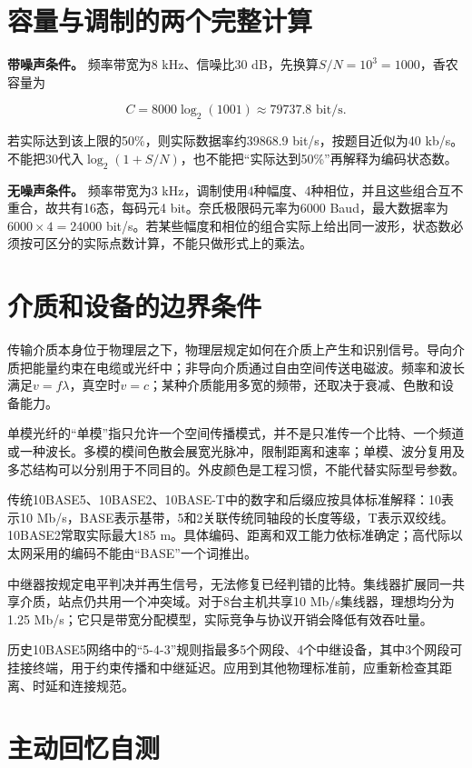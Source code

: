 \section{容量与调制的两个完整计算}\label{CN02-course-capacity}

\textbf{带噪声条件。} 频率带宽为8 kHz、信噪比30 dB，先换算\(S/N=10^3=1000\)，香农容量为

\[C=8000\log_2(1001)\approx79737.8\text{ bit/s}.\]

若实际达到该上限的50\%，则实际数据率约39868.9 bit/s，按题目近似为40 kb/s。不能把30代入\(\log_2(1+S/N)\)，也不能把``实际达到50\%''再解释为编码状态数。

\textbf{无噪声条件。} 频率带宽为3 kHz，调制使用4种幅度、4种相位，并且这些组合互不重合，故共有16态，每码元4 bit。奈氏极限码元率为6000 Baud，最大数据率为\(6000\times4=24000\) bit/s。若某些幅度和相位的组合实际上给出同一波形，状态数必须按可区分的实际点数计算，不能只做形式上的乘法。

\section{介质和设备的边界条件}\label{CN02-course-media}

传输介质本身位于物理层之下，物理层规定如何在介质上产生和识别信号。导向介质把能量约束在电缆或光纤中；非导向介质通过自由空间传送电磁波。频率和波长满足\(v=f\lambda\)，真空时\(v=c\)；某种介质能用多宽的频带，还取决于衰减、色散和设备能力。

单模光纤的``单模''指只允许一个空间传播模式，并不是只准传一个比特、一个频道或一种波长。多模的模间色散会展宽光脉冲，限制距离和速率；单模、波分复用及多芯结构可以分别用于不同目的。外皮颜色是工程习惯，不能代替实际型号参数。

传统10BASE5、10BASE2、10BASE-T中的数字和后缀应按具体标准解释：10表示10 Mb/s，BASE表示基带，5和2关联传统同轴段的长度等级，T表示双绞线。10BASE2常取实际最大185 m。具体编码、距离和双工能力依标准确定；高代际以太网采用的编码不能由``BASE''一个词推出。

中继器按规定电平判决并再生信号，无法修复已经判错的比特。集线器扩展同一共享介质，站点仍共用一个冲突域。对于8台主机共享10 Mb/s集线器，理想均分为1.25 Mb/s；它只是带宽分配模型，实际竞争与协议开销会降低有效吞吐量。

历史10BASE5网络中的``5-4-3''规则指最多5个网段、4个中继设备，其中3个网段可挂接终端，用于约束传播和中继延迟。应用到其他物理标准前，应重新检查其距离、时延和连接规范。

\section{主动回忆自测}\label{CN02-review}

